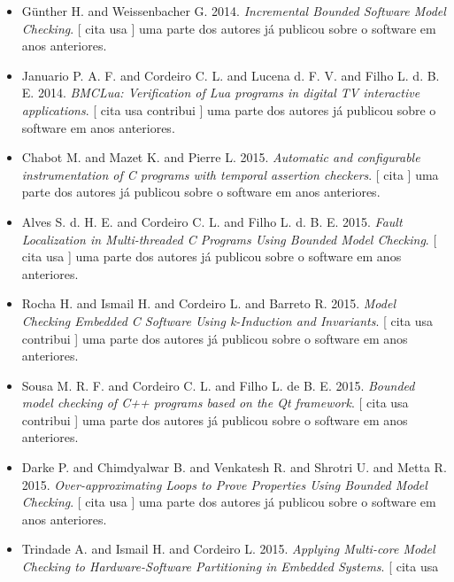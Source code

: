 \begin{itemize}
      [
          cita
      ]
nenhum dos autores publicou sobre o software antes.
\item G\"{u}nther H. and Weissenbacher G.
      2014.
        \textit{ Incremental Bounded Software Model Checking}.
      [
          cita
          usa
      ]
uma parte dos autores já publicou sobre o software em anos anteriores.
\item Januario P. A. F. and Cordeiro C. L. and Lucena d. F. V. and Filho L. d. B. E.
      2014.
        \textit{ BMCLua: Verification of Lua programs in digital TV interactive applications}.
      [
          cita
          usa
          contribui
      ]
uma parte dos autores já publicou sobre o software em anos anteriores.
\item Chabot M. and Mazet K. and Pierre L.
      2015.
        \textit{ Automatic and configurable instrumentation of C programs with temporal assertion checkers}.
      [
          cita
      ]
uma parte dos autores já publicou sobre o software em anos anteriores.
\item Alves S. d. H. E. and Cordeiro C. L. and Filho L. d. B. E.
      2015.
        \textit{ Fault Localization in Multi-threaded C Programs Using Bounded Model Checking}.
      [
          cita
          usa
      ]
uma parte dos autores já publicou sobre o software em anos anteriores.
\item Rocha H. and Ismail H. and Cordeiro L. and Barreto R.
      2015.
        \textit{ Model Checking Embedded C Software Using k-Induction and Invariants}.
      [
          cita
          usa
          contribui
      ]
uma parte dos autores já publicou sobre o software em anos anteriores.
\item Sousa M. R. F. and Cordeiro C. L. and Filho L. de B. E.
      2015.
        \textit{ Bounded model checking of C++ programs based on the Qt framework}.
      [
          cita
          usa
          contribui
      ]
uma parte dos autores já publicou sobre o software em anos anteriores.
\item Darke P. and Chimdyalwar B. and Venkatesh R. and Shrotri U. and Metta R.
      2015.
        \textit{ Over-approximating Loops to Prove Properties Using Bounded Model Checking}.
      [
          cita
          usa
      ]
uma parte dos autores já publicou sobre o software em anos anteriores.
\item Trindade A. and Ismail H. and Cordeiro L.
      2015.
        \textit{ Applying Multi-core Model Checking to Hardware-Software Partitioning in Embedded Systems}.
      [
          cita
          usa

\end{itemize}
